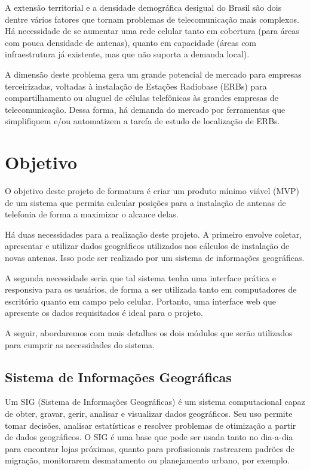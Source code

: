 \documentclass[]{politex}
\begin{document}
A extensão territorial e a densidade demográfica desigual do Brasil são dois
dentre vários fatores que tornam problemas de telecomunicação mais complexos.
Há necessidade de se aumentar uma rede celular tanto em cobertura (para áreas
com pouca densidade de antenas), quanto em capacidade (áreas com infraestrutura
já existente, mas que não suporta a demanda local).

A dimensão deste problema gera um grande potencial de mercado para empresas
terceirizadas, voltadas à instalação de Estações Radiobase (ERBs) para
compartilhamento ou aluguel de células telefônicas às grandes empresas de
telecomunicação. Dessa forma, há demanda do mercado por ferramentas que
simplifiquem e/ou automatizem a tarefa de estudo de localização de ERBs.

\section{Objetivo}

O objetivo deste projeto de formatura é criar um produto mínimo viável (MVP) de
um sistema que permita calcular posições para a instalação de antenas de
telefonia de forma a maximizar o alcance delas.

Há duas necessidades para a realização deste projeto. A primeiro envolve
coletar, apresentar e utilizar dados geográficos utilizados nos cálculos
de instalação de novas antenas. Isso pode ser realizado por um sistema de
informações geográficas.

A segunda necessidade seria que tal sistema tenha uma interface prática e
responsiva para os usuários, de forma a ser utilizada tanto em computadores de
escritório quanto em campo pelo celular. Portanto, uma interface web que
apresente os dados requisitados é ideal para o projeto.

A seguir, abordaremos com mais detalhes os dois módulos que serão utilizados
para cumprir as necessidades do sistema.

\subsection{Sistema de Informações Geográficas}

Um SIG (Sistema de Informações Geográficas) é um sistema computacional capaz de
obter, gravar, gerir, analisar e visualizar dados geográficos. Seu uso permite
tomar decisões, analisar estatísticas e resolver problemas de otimização a
partir de dados geográficos. O SIG é uma base que pode ser usada tanto no
dia-a-dia para encontrar lojas próximas, quanto para profissionais rastrearem
padrões de migração, monitorarem desmatamento ou planejamento urbano,
por exemplo.
\end{document}
